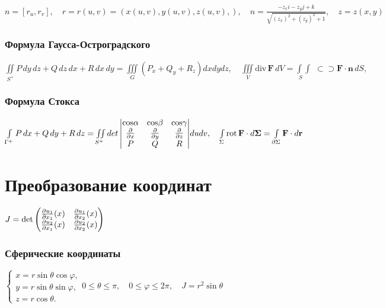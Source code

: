 $n = [r_u, r_v], \quad r = r(u,v) = (x(u,v), y(u,v), z(u,v),) , \quad n = \frac{-z_x i-z_y j+k}{\sqrt{(z_x)^2 + (z_y)^2 + 1}}, \quad z = z(x,y)$


\subsubsection{Формула Гаусса-Остроградского}
${\iint \limits _{S^{+}}{P\,dy\,dz+Q\,dz\,dx+R\,dx\,dy}} = {\iiint \limits _{G} \left(P_x + Q_y + R_z\right)dxdydz}, \quad \iiint\limits_V\mathrm{div}\,\mathbf{F}\,dV=\int\limits_{\,\,S}\!\!\!\!\int\!\!\!\!\!\!\!\!\!\!\!\!\,\!\!\,\subset\!\!\supset\mathbf F\cdot\mathbf{n}\,dS,$

\subsubsection{Формула Стокса}
${\int \limits _{\Gamma ^{+}}{P\,dx+Q\,dy+R\,dz}} = \iint \limits _{S^{+}}{det \begin{vmatrix}\rm{cos}\alpha &\rm{cos}\beta&\rm{cos}\gamma\\ \frac {\partial}{\partial x}&\frac {\partial}{\partial y}&\frac {\partial}{\partial z}\\P&Q&R\end{vmatrix}}dudv, \quad \int \limits _{\Sigma }{\mathrm  {rot}}\,{\mathbf  {F}}\cdot d{\mathbf  {\Sigma }}=\int \limits _{{\partial \Sigma }}{\mathbf  {F}}\cdot d{\mathbf  {r}}$

\section{Преобразование координат}

$J = \det {\begin{pmatrix}{\frac{\partial{u_{1}}}{\partial{x_{1}}}}(x)&{\frac{\partial{u_{1}}}{\partial{x_{2}}}}(x)\\{\frac{\partial{u_{2}}}{\partial{x_{1}}}}(x)&{\frac{\partial{u_{2}}}{\partial{x_{2}}}}(x)\end{pmatrix}}$

\subsubsection{Сферические координаты} 

${\begin{cases}x=r\sin \theta \cos \varphi ,\\y=r\sin \theta \sin \varphi ,\\z=r\cos \theta .\end{cases}} 0 \le \theta \le \pi, \quad 0 \le \varphi \le 2\pi, \quad J=r^{2}\sin \theta $


